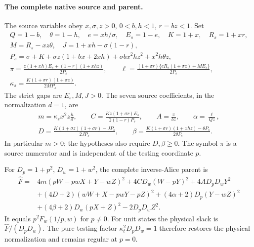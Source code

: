 \paragraph{The complete native source and parent.}
The source variables obey $x,\sigma,z>0$, $0<b,h<1$,
$r=bz<1$. Set
\begin{gather*}
 Q=1-b,\quad \theta=1-h,\quad e=xh/\sigma,\quad E_s=1-e,
 \quad K=1+x,\quad R_s=1+xr,\\
 M=R_s-xz\theta,\quad J=1+xh-\sigma(1-r),\\
 P_s=\sigma+K+\sigma z(1+bx+2xh)
                   +\sigma bx^2hz^2+x^2h\theta z,\\
 \pi=\frac{z(1+xh)E_s+(1-r)(1+xhz)}{2P_s},\qquad
 \ell=\frac{(1+\sigma r)\{eR_s(1+\sigma z)+ME_s\}}{2P_s},\\
 \kappa_s=\frac{K(1+\sigma r)(1+\sigma z)}{2MP_s}.
\end{gather*}
The strict gaps are $E_s,M,J>0$. The seven source coefficients,
in the normalization $d=1$, are
\begin{gather*}
 m=\kappa_s x^2z\frac h\sigma,\qquad
 C=\frac{Kz(1+\sigma r)E_s}{2(1-r)P_s},\qquad
 A=\frac\pi{bz},\qquad \alpha=\frac\ell{Qz},\\
 D=\frac{K(1+\sigma z)(1+\sigma r)-JP_s}{2JP_s},\qquad
 \beta=\frac{K(1+\sigma r)(1+xhz)-\theta P_s}{2\theta P_s}.
\end{gather*}
In particular $m>0$; the hypotheses also require $D,\beta\ge0$.
The symbol $\pi$ is a source numerator and is independent of the
testing coordinate $p$.

For $D_p=1+p^2$, $D_w=1+w^2$, the complete inverse-Alice parent is
\begin{equation}\label{eq:allz-explicit-parent}
\begin{split}
 \widehat F={}&4m(pW-pwX+Y-wZ)^2+4CD_w(W-pY)^2
                         +4AD_pD_wY^2\\
 &+(4D+2)(wW+X-pwY-pZ)^2
        +(4\alpha+2)D_p(Y-wZ)^2\\
 &+(4\beta+2)D_w(pX+Z)^2-2D_pD_wZ^2.
\end{split}
\end{equation}
It equals $p^2F_w(1/p,w)$ for $p\ne0$. For unit states the physical
slack is $\widehat F/(D_pD_w)$. The pure testing factor
$\kappa_t^2D_pD_w=1$ therefore restores the physical normalization
and remains regular at $p=0$.

